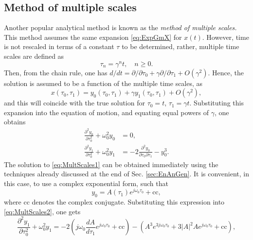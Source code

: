 \documentclass[11pt,twoside,a4paper,english]{book}
\begin{document}
\subsection{Method of multiple scales}\label{sec:MultScales}

Another popular analytical method is known as the \emph{method of multiple scales.} This method assumes the same expansion \eqref{eq:ExpGmX} for $x(t)$. However, time is not rescaled in terms of a constant $\tau$ to be determined, rather, multiple time scales are defined as 
\begin{equation}
\tau_n = \gamma^n t, \quad n \geq 0.
\end{equation}
Then, from the chain rule, one has $d/dt = \partial/\partial{\tau_0} + \gamma \partial/\partial {\tau_1} + O(\gamma^2)$. Hence, the solution is assumed to be a function of the multiple time scales, as
\begin{equation}\label{eq:MultScalesExp}
x(\tau_0,\tau_1) = y_0(\tau_0,\tau_1) + \gamma y_1(\tau_0,\tau_1) + O(\gamma^2),
\end{equation}
and this will coincide with the true solution for $\tau_0 = t$, $\tau_1 = \gamma t$. Substituting this expansion into the equation of motion, and equating equal powers of $\gamma$, one obtains
\begin{subequations}
    \begin{align}
          \frac{\partial^2 y_0}{\partial \tau_0^2} + \omega_0^2 y_0 &= 0, \label{eq:MultScales1}\\
          \frac{\partial^2 y_1}{\partial\tau_0^2} + \omega_0^2 y_1 &=- 2\frac{\partial^2 y_0}{\partial \tau_0 \partial \tau_1} - y_0^3. \label{eq:MultScales2}
    \end{align}
\end{subequations}
The solution to \eqref{eq:MultScales1} can be obtained immediately using the techniques already discussed at the end of Sec. \ref{sec:EnAnGen}. It is convenient, in this case, to use a complex exponential form, such that
\begin{equation}\label{eq:MultScTemp1}
y_0 = A (\tau_1) e^{j\omega_0 \tau_0} + \text{cc},
\end{equation}
where cc denotes the complex conjugate. Substituting this expression into \eqref{eq:MultScales2}, one gets
\begin{equation}
\frac{\partial^2 y_1}{\partial\tau_0^2} + \omega_0^2 y_1 = -2\left(j\omega_0 \frac{dA}{d\tau_1}e^{j\omega_0\tau_0} + \text{cc} \right) - \left(A^3 e^{3j\omega_0 \tau_0} + 3 |A|^2 A e^{j\omega_0 \tau_0} + \text{cc} \right),
\end{equation}
\end{document}
